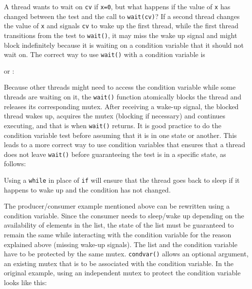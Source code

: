 
A thread wants to wait on \texttt{cv} if \texttt{x=0}, but what happens if the
value of \texttt{x} has changed between the test and the call to
\texttt{wait(cv)}?  If a second thread changes the value of \texttt{x} and
signals \texttt{cv} to wake up the first thread, while the first thread
transitions from the test to \texttt{wait()}, it may miss the wake up signal and
might block indefinitely because it is waiting on a condition variable that it
should not wait on.  The correct way to use \texttt{wait()} with a condition
variable is


or :


Because other threads might need to access the condition variable while some
threads are waiting on it, the \texttt{wait()} function atomically blocks the
thread and releases its corresponding mutex.  After receiving a wake-up signal,
the blocked thread wakes up, acquires the mutex (blocking if necessary) and
continues executing, and that is when \texttt{wait()} returns. It is good
practice to do the condition variable test before assuming that it is in one
state or another. This leads to a more correct way to use condition variables
that ensures that a thread does not leave \texttt{wait()} before guaranteeing
the test is in a specific state, as follows:


Using a \texttt{while} in place of \texttt{if} will ensure that the thread goes
back to sleep if it happens to wake up and the condition has not changed.

The producer/consumer example mentioned above can be rewritten using a condition
variable.  Since the consumer needs to sleep/wake up depending on the
availability of elements in the list, the state of the list must be guaranteed
to remain the same while interacting with the condition variable for the reason
explained above (missing wake-up signals). The list and the condition variable
have to be protected by the same mutex.  \texttt{condvar()} allows an optional
argument, an existing mutex that is to be associated with the condition
variable. In the original example, using an independent mutex to protect the
condition variable looks like this:

